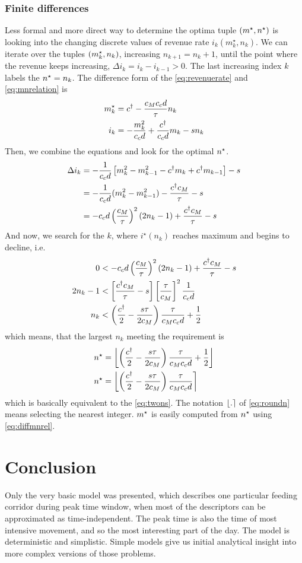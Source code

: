 \documentclass[a4paper]{report}
\DeclarePairedDelimiter\floor{\lfloor}{\rfloor}
\DeclarePairedDelimiter{\nint}{\lfloor}{\rceil}
\begin{document}
\subsubsection{Finite differences}
Less formal and more direct way to determine the optima tuple $(m^{\star},n^\star)$ is looking into the changing discrete values of revenue rate $i_k(m^\star_k,n_k)$. We can iterate over the tuples $(m^{\star}_k,n_k)$, increasing $n_{k+1}=n_k+1$, until the point where the revenue keeps increasing, $\Delta i_k=i_k-i_{k-1}>0$. The last increasing index $k$ labels the $n^\star=n_k$. The difference form of the \autoref{eq:revenuerate} and \autoref{eq:mnrelation} is
\begin{align}
	m^{\star}_k&=c^{\dagger} - \frac{c_Mc_cd}{\tau} n_k \label{eq:diffmnrel}\\
	i_k&=-\frac{m_k^2}{c_cd}+\frac{c^{\dagger}}{c_cd}m_k-sn_k \label{eq:diffincome}
\end{align}
Then, we combine the equations and look for the optimal $n^\star$.
\begin{align*}
	\Delta i_k	&=-\frac{1}{c_cd}\left[m_k^2-m_{k-1}^2 -c^{\dagger} m_k +c^{\dagger} m_{k-1}\right] - s\\
			&=-\frac{1}{c_cd}(m_k^2-m_{k-1}^2)-\frac{c^{\dagger} c_M}{\tau}-s\\
			&=-c_cd\left(\frac{c_M}{\tau}\right)^2(2n_k-1)+\frac{c^{\dagger} c_M}{\tau}-s
\end{align*}
And now, we search for the $k$, where $i^\star(n_k)$ reaches maximum and begins to decline, i.e.
\begin{align*}
	0&<-c_cd\left(\frac{c_M}{\tau}\right)^2(2n_k-1)+\frac{c^{\dagger} c_M}{\tau}-s\\
	2n_k-1&<\left[\frac{c^{\dagger} c_M}{\tau}-s\right]\left[\frac{\tau}{c_M}\right]^2\frac{1}{c_cd}\\
	n_k&<\left(\frac{c^{\dagger}}{2}-\frac{s\tau}{2c_M}\right)\frac{\tau}{c_Mc_c d}+\frac{1}{2}
\end{align*}
which means, that the largest $n_k$ meeting the requirement is
\begin{align}
	\ns&=\floor*{\left(\frac{\cd}{2}-\frac{s\tau}{2c_M}\right)\frac{\tau}{c_Mc_c d}+\frac{1}{2}}\nonumber\\
	\ns&=\nint*{\left(\frac{\cd}{2}-\frac{s\tau}{2c_M}\right)\frac{\tau}{c_Mc_c d}}\label{eq:roundn}
\end{align}
which is basically equivalent to the \autoref{eq:twons}. The notation $\nint*{.}$ of \autoref{eq:roundn} means selecting the nearest integer. $m^{\star}$ is easily computed from $n^\star$ using \autoref{eq:diffmnrel}.

\section{Conclusion}
Only the very basic model was presented, which describes one particular feeding corridor during peak time window, when most of the descriptors can be approximated as time-independent. The peak time is also the time of most intensive movement, and so the most interesting part of the day. The model is deterministic and simplistic. Simple models give us initial analytical insight into more complex versions of those problems.
\end{document}

